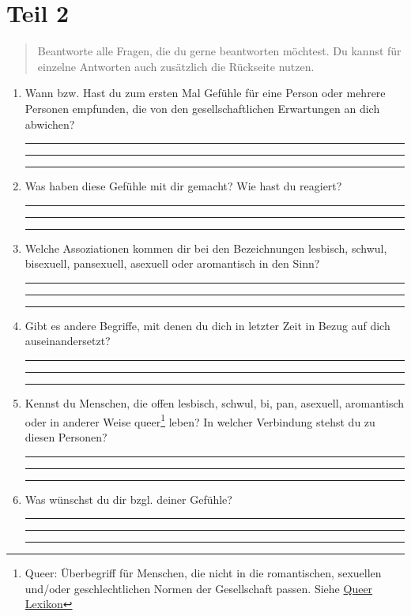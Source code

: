 \documentclass[a4paper,12pt]{article}
\begin{document}
\section*{Teil 2}

\begin{quote}
Beantworte alle Fragen, die du gerne beantworten möchtest. Du kannst für einzelne Antworten auch zusätzlich die Rückseite nutzen.
\end{quote}

\begin{enumerate}[label=--]
    \item Wann bzw. Hast du zum ersten Mal Gefühle für eine Person oder mehrere Personen empfunden, die von den gesellschaftlichen Erwartungen an dich abwichen?  

    \rule{12cm}{0.2pt}

    \rule{12cm}{0.2pt}

    \rule{12cm}{0.2pt}
    
    \item Was haben diese Gefühle mit dir gemacht? Wie hast du reagiert?  

    \rule{12cm}{0.2pt}

    \rule{12cm}{0.2pt}
    
    \rule{12cm}{0.2pt}
    
    \item Welche Assoziationen kommen dir bei den Bezeichnungen lesbisch, schwul, bisexuell, pansexuell, asexuell oder aromantisch in den Sinn?  

    \rule{12cm}{0.2pt}

    \rule{12cm}{0.2pt}
    
    \rule{12cm}{0.2pt}
    
    \item Gibt es andere Begriffe, mit denen du dich in letzter Zeit in Bezug auf dich auseinandersetzt?  

    \rule{12cm}{0.2pt}

    \rule{12cm}{0.2pt}
    
    \rule{12cm}{0.2pt}
    
    \item Kennst du Menschen, die offen lesbisch, schwul, bi, pan, asexuell, aromantisch oder in anderer Weise queer\footnote{Queer: Überbegriff für Menschen, die nicht in die romantischen, sexuellen und/oder geschlechtlichen Normen der Gesellschaft passen. Siehe \href{https://queer-lexikon.net/2017/06/08/queer/}{Queer Lexikon}} leben? In welcher Verbindung stehst du zu diesen Personen?  

    \rule{12cm}{0.2pt}

    \rule{12cm}{0.2pt}
    
    \rule{12cm}{0.2pt}
    
    \item Was wünschst du dir bzgl. deiner Gefühle?  

    \rule{12cm}{0.2pt}

    \rule{12cm}{0.2pt}
    
    \rule{12cm}{0.2pt}
\end{enumerate}
\end{document}
